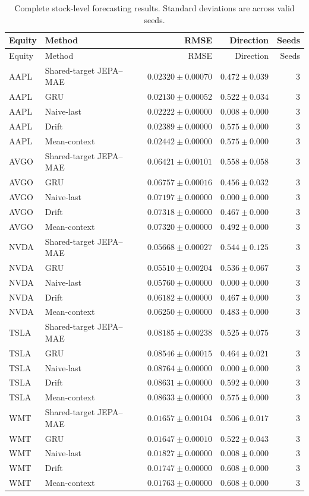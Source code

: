 \begin{longtable}{llrrr}
\caption{Complete stock-level forecasting results. Standard deviations are across valid seeds.}\label{tab:appendix_stock_metrics}\\
\toprule
Equity & Method & RMSE & Direction & Seeds \\
\midrule
\endfirsthead
\toprule
Equity & Method & RMSE & Direction & Seeds \\
\midrule
\endhead
AAPL & Shared-target JEPA--MAE & $0.02320 \pm 0.00070$ & $0.472 \pm 0.039$ & 3 \\
AAPL & GRU & $0.02130 \pm 0.00052$ & $0.522 \pm 0.034$ & 3 \\
AAPL & Naive-last & $0.02222 \pm 0.00000$ & $0.008 \pm 0.000$ & 3 \\
AAPL & Drift & $0.02389 \pm 0.00000$ & $0.575 \pm 0.000$ & 3 \\
AAPL & Mean-context & $0.02442 \pm 0.00000$ & $0.575 \pm 0.000$ & 3 \\
AVGO & Shared-target JEPA--MAE & $0.06421 \pm 0.00101$ & $0.558 \pm 0.058$ & 3 \\
AVGO & GRU & $0.06757 \pm 0.00016$ & $0.456 \pm 0.032$ & 3 \\
AVGO & Naive-last & $0.07197 \pm 0.00000$ & $0.000 \pm 0.000$ & 3 \\
AVGO & Drift & $0.07318 \pm 0.00000$ & $0.467 \pm 0.000$ & 3 \\
AVGO & Mean-context & $0.07320 \pm 0.00000$ & $0.492 \pm 0.000$ & 3 \\
NVDA & Shared-target JEPA--MAE & $0.05668 \pm 0.00027$ & $0.544 \pm 0.125$ & 3 \\
NVDA & GRU & $0.05510 \pm 0.00204$ & $0.536 \pm 0.067$ & 3 \\
NVDA & Naive-last & $0.05760 \pm 0.00000$ & $0.000 \pm 0.000$ & 3 \\
NVDA & Drift & $0.06182 \pm 0.00000$ & $0.467 \pm 0.000$ & 3 \\
NVDA & Mean-context & $0.06250 \pm 0.00000$ & $0.483 \pm 0.000$ & 3 \\
TSLA & Shared-target JEPA--MAE & $0.08185 \pm 0.00238$ & $0.525 \pm 0.075$ & 3 \\
TSLA & GRU & $0.08546 \pm 0.00015$ & $0.464 \pm 0.021$ & 3 \\
TSLA & Naive-last & $0.08764 \pm 0.00000$ & $0.000 \pm 0.000$ & 3 \\
TSLA & Drift & $0.08631 \pm 0.00000$ & $0.592 \pm 0.000$ & 3 \\
TSLA & Mean-context & $0.08633 \pm 0.00000$ & $0.575 \pm 0.000$ & 3 \\
WMT & Shared-target JEPA--MAE & $0.01657 \pm 0.00104$ & $0.506 \pm 0.017$ & 3 \\
WMT & GRU & $0.01647 \pm 0.00010$ & $0.522 \pm 0.043$ & 3 \\
WMT & Naive-last & $0.01827 \pm 0.00000$ & $0.008 \pm 0.000$ & 3 \\
WMT & Drift & $0.01747 \pm 0.00000$ & $0.608 \pm 0.000$ & 3 \\
WMT & Mean-context & $0.01763 \pm 0.00000$ & $0.608 \pm 0.000$ & 3 \\
\bottomrule
\end{longtable}
